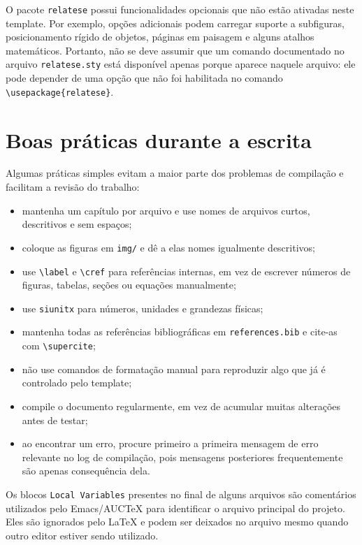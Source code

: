O pacote \verb|relatese| possui funcionalidades opcionais que não estão ativadas neste template. Por exemplo, opções adicionais podem carregar suporte a subfiguras, posicionamento rígido de objetos, páginas em paisagem e alguns atalhos matemáticos. Portanto, não se deve assumir que um comando documentado no arquivo \verb|relatese.sty| está disponível apenas porque aparece naquele arquivo: ele pode depender de uma opção que não foi habilitada no comando \verb|\usepackage{relatese}|.

\section{Boas práticas durante a escrita}
\label{sec:boas_praticas}

Algumas práticas simples evitam a maior parte dos problemas de compilação e facilitam a revisão do trabalho:

\begin{itemize}
\item mantenha um capítulo por arquivo e use nomes de arquivos curtos, descritivos e sem espaços;
\item coloque as figuras em \verb|img/| e dê a elas nomes igualmente descritivos;
\item use \verb|\label| e \verb|\cref| para referências internas, em vez de escrever números de figuras, tabelas, seções ou equações manualmente;
\item use \verb|siunitx| para números, unidades e grandezas físicas;
\item mantenha todas as referências bibliográficas em \verb|references.bib| e cite-as com \verb|\supercite|;
\item não use comandos de formatação manual para reproduzir algo que já é controlado pelo template;
\item compile o documento regularmente, em vez de acumular muitas alterações antes de testar;
\item ao encontrar um erro, procure primeiro a primeira mensagem de erro relevante no log de compilação, pois mensagens posteriores frequentemente são apenas consequência dela.
\end{itemize}

Os blocos \verb|Local Variables| presentes no final de alguns arquivos são comentários utilizados pelo Emacs/AUCTeX para identificar o arquivo principal do projeto. Eles são ignorados pelo LaTeX e podem ser deixados no arquivo mesmo quando outro editor estiver sendo utilizado.

